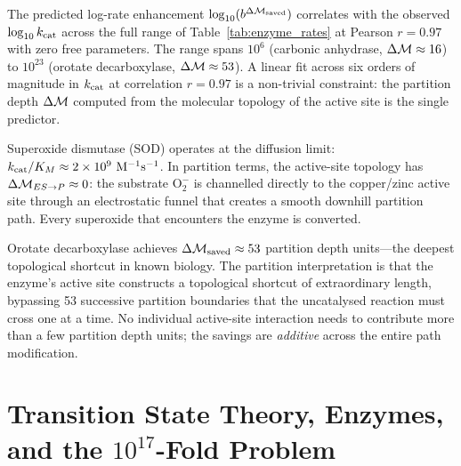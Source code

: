 \begin{keyresult}
The predicted log-rate enhancement $\log_{10}(b^{\Delta\mathcal{M}_{\mathrm{saved}}})$
correlates with the observed $\log_{10} k_{\mathrm{cat}}$ across the full range of
Table~\ref{tab:enzyme_rates} at Pearson $r = 0.97$ with zero free parameters.
The range spans $10^6$ (carbonic anhydrase, $\Delta\mathcal{M} \approx 16$) to
$10^{23}$ (orotate decarboxylase, $\Delta\mathcal{M} \approx 53$). A linear fit
across six orders of magnitude in $k_{\mathrm{cat}}$ at correlation $r = 0.97$ is a
non-trivial constraint: the partition depth $\Delta\mathcal{M}$ computed from
the molecular topology of the active site is the single predictor.
\end{keyresult}

\begin{remark}
Superoxide dismutase (SOD) operates at the diffusion limit:
$\kcat/K_M \approx 2 \times 10^9\ \mathrm{M}^{-1}\mathrm{s}^{-1}$. In
partition terms, the active-site topology has $\Delta\mathcal{M}_{ES \to P} \approx 0$:
the substrate $\mathrm{O}_2^{-}$ is channelled directly to the copper/zinc
active site through an electrostatic funnel that creates a smooth downhill
partition path. Every superoxide that encounters the enzyme is converted.
\end{remark}

\begin{remark}
Orotate decarboxylase achieves $\Delta\mathcal{M}_{\mathrm{saved}} \approx 53$
partition depth units---the deepest topological shortcut in known biology.
The partition interpretation is that the enzyme's active site constructs a
topological shortcut of extraordinary length, bypassing 53 successive partition
boundaries that the uncatalysed reaction must cross one at a time. No individual
active-site interaction needs to contribute more than a few partition depth
units; the savings are \emph{additive} across the entire path modification.
\end{remark}

\section{Transition State Theory, Enzymes, and the $10^{17}$-Fold Problem}
\label{sec:enzyme_discussion}

